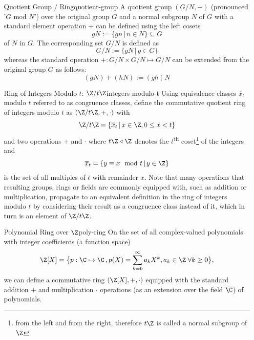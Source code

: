 \begin{definition}{Quotient Group / Ring}{quotient-group}
  A quotient group $(G / N, +)$ (pronounced '$G$ mod $N$') over the original group $G$ and a normal subgroup $N$ of $G$
  with a standard element operation $+$ can be defined using the left cosets
  $$gN := \{gn \,|\, n \in N\} \subseteq G$$ of $N$ in $G$.
  The corresponding set $G / N$ is defined as
  $$G / N := \{g N \,|\, g \in G\}$$
  whereas the standard operation $+: G/N \times G/N \mapsto G/N$
  can be extended from the original group $G$ as follows:
  $$(gN) + (hN) := (gh)N$$
\end{definition}

\begin{definition}{Ring of Integers Modulo $t$: $\Z / t \Z$}{integers-modulo-t}
  Using equivalence classes $\overline{x}_t$ modulo $t$ referred to as congruence classes,
  define the commutative quotient ring of integers modulo $t$ as $(\Z / t \Z, +, \cdot)$ with
  $$\Z / t \Z = \{\overline{x}_t \,|\, x \in \Z, 0 \leq x < t\}$$
  and two operations $+$ and $\cdot$
  where $t \Z \triangleleft \Z$ denotes the $t$\textsuperscript{th} coset\footnote{
    from the left and from the right, therefore $t \Z$ is called a normal subgroup of $\Z$
  } of the integers and
  $$\overline{x}_t = \{y \equiv x \mod t \,|\, y \in \Z\}$$
  is the set of all multiples of $t$ with remainder $x$.
  Note that many operations that resulting groups, rings or fields are commonly equipped with,
  such as addition or multiplication, propagate to an equivalent definition in the ring of integers modulo $t$
  by considering their result as a congruence class instead of it, which in turn is an element of $\Z / t \Z$.
\end{definition}

\begin{definition}{Polynomial Ring over $\Z$}{poly-ring}
  On the set of all complex-valued polynomials with integer coefficients (a function space)
  $$\Z[X] = \big\{p: \C \mapsto \C \,, p(X) = \sum_{k=0}^\infty a_k X^k, a_k \in \Z \;\forall k \geq 0\big\},$$
  we can define a commutative ring $(\Z[X], +, \cdot)$ equipped with the
  standard addition $+$ and multiplication $\cdot$ operations (as an extension over the field $\C$)
  of polynomials.
\end{definition}

